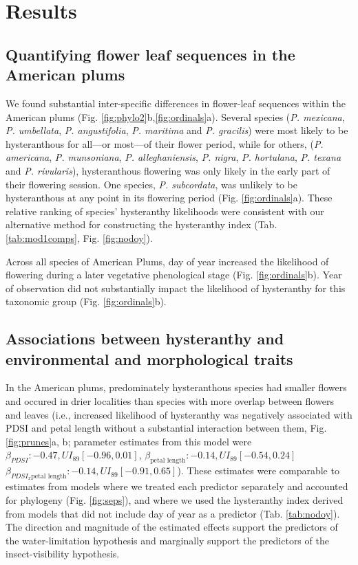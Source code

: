 \documentclass{article}[12pt]
\begin{document}
{\section*{Results}
\subsection*{Quantifying flower leaf sequences in the American plums}
We found substantial inter-specific differences in flower-leaf sequences within the American plums (Fig. \ref{fig:phylo2}b,\ref{fig:ordinals}a). Several species (\emph{P. mexicana}, \textit{P. umbellata}, \textit{P. angustifolia}, \textit{P. maritima} and \textit{P. gracilis}) were most likely to be hysteranthous for all---or most---of their flower period, while for others, (\textit{P. americana}, \textit{P. munsoniana}, \textit{P. alleghaniensis}, \textit{P. nigra}, \textit{P. hortulana}, \textit{P. texana} and \textit{P. rivularis}), hysteranthous flowering was only likely in the early part of their flowering session. One species, \emph{P. subcordata}, was unlikely to be hysteranthous at any point in its flowering period (Fig. \ref{fig:ordinals}a). These relative ranking of species' hysteranthy likelihoods were consistent with our alternative method for constructing the hysteranthy index (Tab. \ref{tab:mod1comps}, Fig. \ref{fig:nodoy}).


Across all species of American Plums, day of year increased the likelihood of flowering during a later vegetative phenological stage (Fig. \ref{fig:ordinals}b). Year of observation did not substantially impact the likelihood of hysteranthy for this taxonomic group (Fig. \ref{fig:ordinals}b).

 
\subsection*{Associations between hysteranthy and environmental and morphological traits}
In the American plums, predominately hysteranthous species had smaller flowers and occured in drier localities than species with more overlap between flowers and leaves (i.e., increased likelihood of hysteranthy was negatively associated with PDSI and petal length without a substantial interaction between them, Fig. \ref{fig:prunes}a, b; parameter estimates from this model were  $\beta_{PDSI}: -0.47, UI_{89}[-0.96, 0.01]$, $\beta_{\text{petal length}}: -0.14,UI_{89}[ -0.54, 0.24]$  $\beta_{PDSI_x \text{petal length}}: -0.14,UI_{89}[ -0.91, 0.65]$). These estimates were comparable to estimates from models where we treated each predictor separately and accounted for phylogeny (Fig. \ref{fig:seps}), and where we used the hysteranthy index derived from models that did not include day of year as a predictor (Tab. \ref{tab:nodoy}). The direction and magnitude of the estimated effects support the predictors of the water-limitation hypothesis and marginally support the predictors of the insect-visibility hypothesis. 

}
\end{document}
